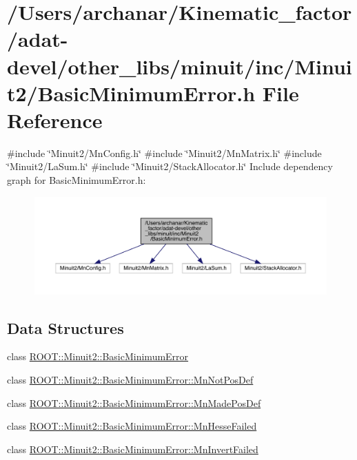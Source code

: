 \hypertarget{adat-devel_2other__libs_2minuit_2inc_2Minuit2_2BasicMinimumError_8h}{}\section{/\+Users/archanar/\+Kinematic\+\_\+factor/adat-\/devel/other\+\_\+libs/minuit/inc/\+Minuit2/\+Basic\+Minimum\+Error.h File Reference}
\label{adat-devel_2other__libs_2minuit_2inc_2Minuit2_2BasicMinimumError_8h}
{\ttfamily \#include \char`\"{}Minuit2/\+Mn\+Config.\+h\char`\"{}}\newline
{\ttfamily \#include \char`\"{}Minuit2/\+Mn\+Matrix.\+h\char`\"{}}\newline
{\ttfamily \#include \char`\"{}Minuit2/\+La\+Sum.\+h\char`\"{}}\newline
{\ttfamily \#include \char`\"{}Minuit2/\+Stack\+Allocator.\+h\char`\"{}}\newline
Include dependency graph for Basic\+Minimum\+Error.\+h\+:
\nopagebreak
\begin{figure}[H]
\begin{center}
\leavevmode
\includegraphics[width=350pt]{dc/d60/adat-devel_2other__libs_2minuit_2inc_2Minuit2_2BasicMinimumError_8h__incl}
\end{center}
\end{figure}
\subsection*{Data Structures}
\begin{DoxyCompactItemize}
\item 
class \mbox{\hyperlink{classROOT_1_1Minuit2_1_1BasicMinimumError}{R\+O\+O\+T\+::\+Minuit2\+::\+Basic\+Minimum\+Error}}
\item 
class \mbox{\hyperlink{classROOT_1_1Minuit2_1_1BasicMinimumError_1_1MnNotPosDef}{R\+O\+O\+T\+::\+Minuit2\+::\+Basic\+Minimum\+Error\+::\+Mn\+Not\+Pos\+Def}}
\item 
class \mbox{\hyperlink{classROOT_1_1Minuit2_1_1BasicMinimumError_1_1MnMadePosDef}{R\+O\+O\+T\+::\+Minuit2\+::\+Basic\+Minimum\+Error\+::\+Mn\+Made\+Pos\+Def}}
\item 
class \mbox{\hyperlink{classROOT_1_1Minuit2_1_1BasicMinimumError_1_1MnHesseFailed}{R\+O\+O\+T\+::\+Minuit2\+::\+Basic\+Minimum\+Error\+::\+Mn\+Hesse\+Failed}}
\item 
class \mbox{\hyperlink{classROOT_1_1Minuit2_1_1BasicMinimumError_1_1MnInvertFailed}{R\+O\+O\+T\+::\+Minuit2\+::\+Basic\+Minimum\+Error\+::\+Mn\+Invert\+Failed}}
\end{DoxyCompactItemize}
